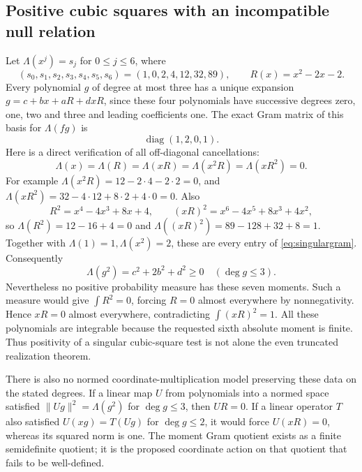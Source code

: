 \documentclass[11pt]{article}
\begin{document}
\subsection{Positive cubic squares with an incompatible null relation}
Let $\Lambda(x^j)=s_j$ for $0\leq j\leq6$, where
\[
 (s_0,s_1,s_2,s_3,s_4,s_5,s_6)=(1,0,2,4,12,32,89),
 \qquad R(x)=x^2-2x-2.
\]
Every polynomial $g$ of degree at most three has a unique expansion
$g=c+bx+aR+dxR$, since these four polynomials have successive
degrees zero, one, two and three and leading coefficients one.
The exact Gram matrix of this basis for $\Lambda(fg)$ is
\begin{equation}\label{eq:singulargram}
 \operatorname{diag}(1,2,0,1).
\end{equation}
Here is a direct verification of all off-diagonal cancellations:
\[
 \Lambda(x)=\Lambda(R)=\Lambda(xR)
 =\Lambda(x^2R)=\Lambda(xR^2)=0.
\]
For example $\Lambda(x^2R)=12-2\cdot4-2\cdot2=0$,
and $\Lambda(xR^2)=32-4\cdot12+8\cdot2+4\cdot0=0$.
Also
\[
 R^2=x^4-4x^3+8x+4,\qquad
 (xR)^2=x^6-4x^5+8x^3+4x^2,
\]
so $\Lambda(R^2)=12-16+4=0$ and
$\Lambda((xR)^2)=89-128+32+8=1$.
Together with $\Lambda(1)=1,\Lambda(x^2)=2$, these are
every entry of \eqref{eq:singulargram}. Consequently
\[
 \Lambda(g^2)=c^2+2b^2+d^2\geq0
 \quad(\deg g\leq3).
\]
Nevertheless no positive probability measure has these seven
moments. Such a measure would give $\int R^2=0$, forcing $R=0$
almost everywhere by nonnegativity. Hence $xR=0$ almost everywhere,
contradicting $\int(xR)^2=1$. All these polynomials are integrable
because the requested sixth absolute moment is finite.
Thus positivity of a singular cubic-square test is not alone
the even truncated realization theorem.

There is also no normed coordinate-multiplication model preserving
these data on the stated degrees. If a linear map $U$ from
polynomials into a normed space satisfied
$\|Ug\|^2=\Lambda(g^2)$ for $\deg g\leq3$, then $UR=0$.
If a linear operator $T$ also satisfied $U(xg)=T(Ug)$ for
$\deg g\leq2$, it would force $U(xR)=0$, whereas its squared
norm is one. The moment Gram quotient exists as a finite
semidefinite quotient; it is the proposed coordinate action on
that quotient that fails to be well-defined.
\end{document}
